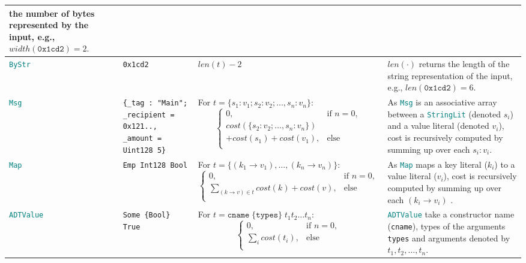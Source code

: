 \documentclass[9pt]{article}
\begin{document}
\begin{table}[!hbt]
\begin{tabular}{|p{2.0cm}|p{4.4cm}|p{6.0cm}|p{3cm}|}
		the number of bytes represented by the input, e.g.,
		$width(\texttt{0x1cd2}) = 2.$ \\ \hline
		\texttt{\textcolor{teal}{ByStr}} & \texttt{0x1cd2}  & $len(t)-2$ & $len(\cdot)$ returns
		the length of the string representation of the input, e.g.,
		$len(\texttt{0x1cd2}) = 6.$ \\ \hline
		\texttt{\textcolor{teal}{Msg}} & \texttt{\{\_tag : "Main"; \_recipient
		= 0x121.., \_amount =
		Uint128 5\}} & For $t = \{s_1 : v_1; s_2 : v_2;
		\ldots, s_n : v_n\}$:
		$$ \begin{cases}
    		0, & \text{if } n = 0,  \\
    cost(\{s_2 : v_2; \ldots, s_n : v_n\}) \\
    		 + cost(s_1) + cost(v_1), & 
    		\text{else } \\
  \end{cases}
		$$ & As \texttt{\textcolor{teal}{Msg}} is an associative array
		between a  \texttt{\textcolor{teal}{StringLit}} (denoted $s_i$) and a
		value literal (denoted $v_i$), cost
		is recursively computed by summing up over each $s_i : v_i$.   \\ \hline
		\texttt{\textcolor{teal}{Map}} & \texttt{Emp Int128 Bool} &
		For $t = \{(k_1 \rightarrow v_1), 
		\ldots, (k_n \rightarrow v_n)\}$:
		$$ \begin{cases}
    		0, & \text{if } n = 0,  \\
  			\sum_{(k \rightarrow v) \in t} {cost(k) + cost(v)},  &
    		\text{else } \\
  \end{cases}
		$$ & As \texttt{\textcolor{teal}{Map}} maps a key literal ($k_i$) to a
		value literal ($v_i$),  cost
		is recursively computed by summing up over each $(k_i \rightarrow v_i)$ . \\ \hline
		\texttt{\textcolor{teal}{ADTValue}} & \texttt{Some \{Bool\} True}  & For $t = \texttt{cname}\;
		\{\texttt{types}\} \; t_1 t_2 \ldots t_n $:
		$$ \begin{cases}
    		0, & \text{if } n = 0,  \\
  			\sum_{i} {cost(t_i)},  &
    		\text{else } \\
  		\end{cases}
		$$ 
		
		& \texttt{\textcolor{teal}{ADTValue}} take a constructor name
		(\texttt{cname}), types of the arguments \texttt{types} and arguments
		denoted by $t_1, t_2, \ldots, t_n$.  \\ \hline
	\end{tabular}
	\end{table}
 
\end{document}
